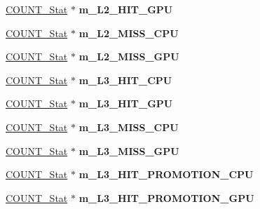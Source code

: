 \begin{DoxyCompactItemize}
\item 
\hypertarget{classall__stats__c_a7c0763aebf3c1193f1ebb16e04e862b3}{
\hyperlink{classCOUNT__Stat}{COUNT\_\-Stat} $\ast$ {\bfseries m\_\-L2\_\-HIT\_\-GPU}}
\label{classall__stats__c_a7c0763aebf3c1193f1ebb16e04e862b3}

\item 
\hypertarget{classall__stats__c_a53bfa4a592f2b0a7aeca63d833ea1f76}{
\hyperlink{classCOUNT__Stat}{COUNT\_\-Stat} $\ast$ {\bfseries m\_\-L2\_\-MISS\_\-CPU}}
\label{classall__stats__c_a53bfa4a592f2b0a7aeca63d833ea1f76}

\item 
\hypertarget{classall__stats__c_a7826c9a5b31a3ee0dec9ee4bd9bf47af}{
\hyperlink{classCOUNT__Stat}{COUNT\_\-Stat} $\ast$ {\bfseries m\_\-L2\_\-MISS\_\-GPU}}
\label{classall__stats__c_a7826c9a5b31a3ee0dec9ee4bd9bf47af}

\item 
\hypertarget{classall__stats__c_aee87e571553583bf17c87d503830e19f}{
\hyperlink{classCOUNT__Stat}{COUNT\_\-Stat} $\ast$ {\bfseries m\_\-L3\_\-HIT\_\-CPU}}
\label{classall__stats__c_aee87e571553583bf17c87d503830e19f}

\item 
\hypertarget{classall__stats__c_a907246e6e9f134013c635e4abec77992}{
\hyperlink{classCOUNT__Stat}{COUNT\_\-Stat} $\ast$ {\bfseries m\_\-L3\_\-HIT\_\-GPU}}
\label{classall__stats__c_a907246e6e9f134013c635e4abec77992}

\item 
\hypertarget{classall__stats__c_ace737ad3cc40dabc03129b7182e36061}{
\hyperlink{classCOUNT__Stat}{COUNT\_\-Stat} $\ast$ {\bfseries m\_\-L3\_\-MISS\_\-CPU}}
\label{classall__stats__c_ace737ad3cc40dabc03129b7182e36061}

\item 
\hypertarget{classall__stats__c_aa67391af60fbe754252e69dd1ec971f1}{
\hyperlink{classCOUNT__Stat}{COUNT\_\-Stat} $\ast$ {\bfseries m\_\-L3\_\-MISS\_\-GPU}}
\label{classall__stats__c_aa67391af60fbe754252e69dd1ec971f1}

\item 
\hypertarget{classall__stats__c_a8c20d6eb60364a07662297614a6b7f07}{
\hyperlink{classCOUNT__Stat}{COUNT\_\-Stat} $\ast$ {\bfseries m\_\-L3\_\-HIT\_\-PROMOTION\_\-CPU}}
\label{classall__stats__c_a8c20d6eb60364a07662297614a6b7f07}

\item 
\hypertarget{classall__stats__c_ab02bfb98579526202fc91e948b46b2c4}{
\hyperlink{classCOUNT__Stat}{COUNT\_\-Stat} $\ast$ {\bfseries m\_\-L3\_\-HIT\_\-PROMOTION\_\-GPU}}
\label{classall__stats__c_ab02bfb98579526202fc91e948b46b2c4}


\end{DoxyCompactItemize}
